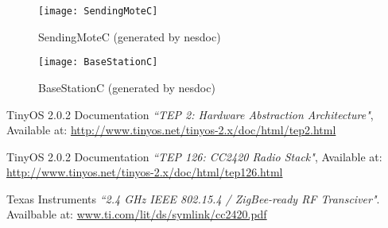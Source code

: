 \documentclass[a4paper,11pt]{article}
\begin{document}
  \begin{figure}[h]
    \centering
    \texttt{[image: SendingMoteC]}
    \caption{SendingMoteC (generated by nesdoc)}
    \label{fig:sendingmotec}
  \end{figure}


  \begin{figure}[h]
    \centering
    \texttt{[image: BaseStationC]}
    \caption{BaseStationC (generated by nesdoc)}
    \label{fig:basestationc}
  \end{figure}



\begin{thebibliography}{1}
    TinyOS 2.0.2 Documentation
    \emph{``TEP 2: Hardware Abstraction Architecture"},
    Available at:
    \url{http://www.tinyos.net/tinyos-2.x/doc/html/tep2.html}

    TinyOS 2.0.2 Documentation
    \emph{``TEP 126: CC2420 Radio Stack"},
    Available at:
    \url{http://www.tinyos.net/tinyos-2.x/doc/html/tep126.html}

    Texas Instruments
    \emph{``2.4 GHz IEEE 802.15.4 / ZigBee-ready RF Transciver"}.
    Availbable at:
    \url{www.ti.com/lit/ds/symlink/cc2420.pdf}

\end{thebibliography}
\end{document}
